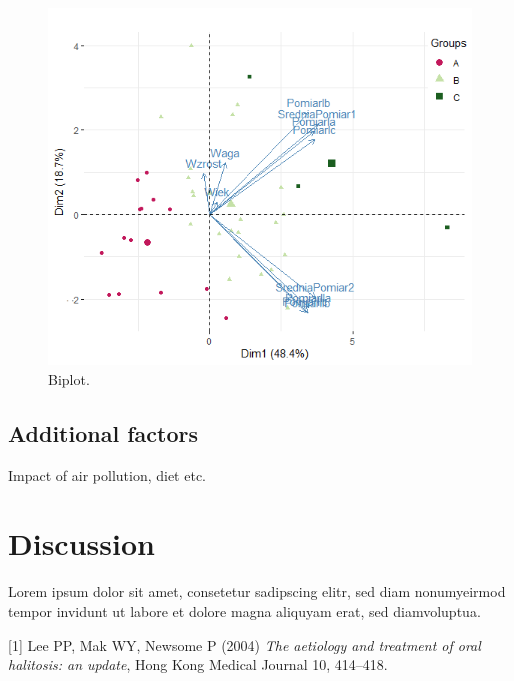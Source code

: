 \documentclass[12pt,a4paper,notitlepage]{report}
\begin{document}
\begin{figure}[h]
	\includegraphics[scale=0.95]{./Figures/Fig_3.4}
	\caption{Biplot.}
	\label{Fig_3.4}
\end{figure}	




\section{Additional factors}
Impact of air pollution, diet etc.


\chapter{Discussion}
Lorem ipsum dolor sit amet, consetetur sadipscing elitr, sed diam nonumyeirmod tempor invidunt ut labore et dolore magna aliquyam erat, sed diamvoluptua. 



\begin{thebibliography}{9}
[1] Lee PP, Mak WY, Newsome P (2004) \emph{The aetiology and treatment of oral halitosis: an update}, Hong Kong Medical Journal  10, 414–418.
\bibitem[2]{ }  \emph{ }
\bibitem[3]{ } \emph{}
\bibitem[4]{ }   \emph{ }
\end{thebibliography}
\end{document}
